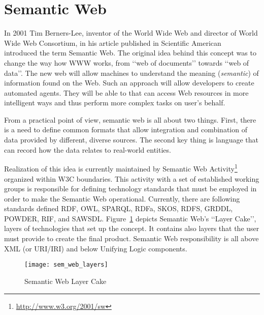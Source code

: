 %
\section{Semantic Web}
\label{sec:ch2_semantic_web}

In 2001 Tim Berners-Lee, inventor of the World Wide Web and director of World Wide Web Consortium, in his article published in Scientific American~\cite{berneslee:semanticWeb} introduced the term Semantic Web. The original idea behind this concept was to change the way how WWW works, from \lq\lq{}web of documents\rq\rq{} towards \lq\lq{}web of data\rq\rq{}. The new web will allow machines to understand the meaning (\emph{semantic}) of information found on the Web. Such an approach will allow developers to create automated agents. They will be able to that can access Web resources in more intelligent ways and thus perform more complex tasks on user\rq{}s behalf.

From a practical point of view, semantic web is all about two things. First, there is a need to define common formats that allow integration and combination of data provided by different, diverse sources. The second key thing is language that can record how the data relates to real-world entities.

Realization of this idea is currently maintained by Semantic Web Activity\footnote{\url{http://www.w3.org/2001/sw}} organized within W3C boundaries. This activity with a set of established working groups is responsible for defining technology standards that must be employed in order to make the Semantic Web operational. Currently, there are following standards defined RDF, OWL, SPARQL, RDFa, SKOS, RDFS, GRDDL, POWDER, RIF, and SAWSDL. Figure~\ref{fig:sem_web_layers} depicts Semantic Web\rq{}s \lq\lq{}Layer Cake\rq\rq{}, layers of technologies that set up the concept. It contains also layers that the user must provide to create the final product. Semantic Web responsibility is all above XML (or URI/IRI) and below Unifying Logic components.

\begin{figure}[ht]
	\centering
	\texttt{[image: sem\_web\_layers]}
	\caption{Semantic Web Layer Cake}
	\label{fig:sem_web_layers}
\end{figure}

